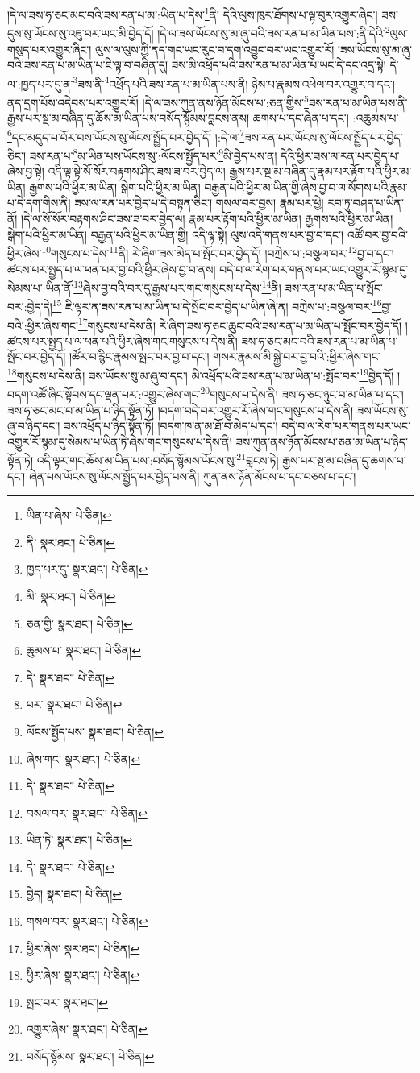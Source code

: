 །དེ་ལ་ཟས་ཧ་ཅང་མང་བའི་ཟས་རན་པ་མ་:ཡིན་པ་དེས་\footnote{ཡིན་པ་ཞེས་  པེ་ཅིན། }ནི། དེའི་ལུས་ཁུར་ཐོགས་པ་ལྟ་བུར་འགྱུར་ཞིང་། ཟས་དུས་སུ་ཡོངས་སུ་འཇུ་བར་ཡང་མི་བྱེད་དོ། །དེ་ལ་ཟས་ཡོངས་སུ་མ་ཞུ་བའི་ཟས་རན་པ་མ་ཡིན་པས་:ནི་དེའི་\footnote{ནི་  སྣར་ཐང་།  པེ་ཅིན། }ལུས་གསུད་པར་འགྱུར་ཞིང་། ལུས་ལ་ལུས་ཀྱི་ནད་གང་ཡང་རུང་བ་དག་འབྱུང་བར་ཡང་འགྱུར་རོ། །ཟས་ཡོངས་སུ་མ་ཞུ་བའི་ཟས་རན་པ་མ་ཡིན་པ་ཇི་ལྟ་བ་བཞིན་དུ། ཟས་མི་འཕྲོད་པའི་ཟས་རན་པ་མ་ཡིན་པ་ཡང་དེ་དང་འདྲ་སྟེ། དེ་ལ་:ཁྱད་པར་དུ་ན་\footnote{ཁྱད་པར་དུ་  སྣར་ཐང་།  པེ་ཅིན། }ཟས་ནི་\footnote{མི་  སྣར་ཐང་།  པེ་ཅིན། }འཕྲོད་པའི་ཟས་རན་པ་མ་ཡིན་པས་ནི། ཉེས་པ་རྣམས་འཕེལ་བར་འགྱུར་བ་དང་། ནད་དྲག་པོས་འདེབས་པར་འགྱུར་རོ། །དེ་ལ་ཟས་ཀུན་ནས་ཉོན་མོངས་པ་:ཅན་གྱིས་\footnote{ཅན་གྱི་  སྣར་ཐང་།  པེ་ཅིན། }ཟས་རན་པ་མ་ཡིན་པས་ནི་རྒྱས་པར་སྔ་མ་བཞིན་དུ་ཆོས་མ་ཡིན་པས་བསོད་སྙོམས་བླངས་ནས། ཆགས་པ་དང་ཞེན་པ་དང་། :འཆུམས་པ་\footnote{ཆུམས་པ་  སྣར་ཐང་།  པེ་ཅིན། }དང་མདུད་པ་བོར་བས་ཡོངས་སུ་ལོངས་སྤྱོད་པར་བྱེད་དོ། །:དེ་ལ་\footnote{དེ་  སྣར་ཐང་།  པེ་ཅིན། }ཟས་རན་པར་ཡོངས་སུ་ལོངས་སྤྱོད་པར་བྱེད་ཅིང་། ཟས་རན་པ་\footnote{པར་  སྣར་ཐང་།  པེ་ཅིན། }མ་ཡིན་པས་ཡོངས་སུ་:ལོངས་སྤྱོད་པར་\footnote{ལོངས་སྤྱོད་པས་  སྣར་ཐང་།  པེ་ཅིན། }མི་བྱེད་པས་ན། དེའི་ཕྱིར་ཟས་ལ་རན་པར་བྱེད་པ་ཞེས་བྱ་སྟེ། འདི་ལྟ་སྟེ་སོ་སོར་བརྟགས་ཤིང་ཟས་ཟ་བར་བྱེད་ལ། རྒྱས་པར་སྔ་མ་བཞིན་དུ་རྣམ་པར་རྟོག་པའི་ཕྱིར་མ་ཡིན། རྒྱགས་པའི་ཕྱིར་མ་ཡིན། སྒེག་པའི་ཕྱིར་མ་ཡིན། བརྒྱན་པའི་ཕྱིར་མ་ཡིན་གྱི་ཞེས་བྱ་བ་ལ་སོགས་པའི་རྣམ་པ་དེ་དག་གིས་ནི། ཟས་ལ་རན་པར་བྱེད་པ་དེ་བསྟན་ཅིང་། གསལ་བར་བྱས། རྣམ་པར་ཕྱེ། རབ་ཏུ་བཤད་པ་ཡིན་ནོ། །དེ་ལ་སོ་སོར་བརྟགས་ཤིང་ཟས་ཟ་བར་བྱེད་ལ། རྣམ་པར་རྟོག་པའི་ཕྱིར་མ་ཡིན། རྒྱགས་པའི་ཕྱིར་མ་ཡིན། སྒེག་པའི་ཕྱིར་མ་ཡིན། བརྒྱན་པའི་ཕྱིར་མ་ཡིན་གྱི། འདི་ལྟ་སྟེ། ལུས་འདི་གནས་པར་བྱ་བ་དང་། འཚོ་བར་བྱ་བའི་ཕྱིར་ཞེས་\footnote{ཞེས་གང་  སྣར་ཐང་།  པེ་ཅིན། }གསུངས་པ་དེས་\footnote{དེ་  སྣར་ཐང་།  པེ་ཅིན། }ནི། རེ་ཞིག་ཟས་མེད་པ་སྤོང་བར་བྱེད་དོ། །བཀྲེས་པ་:བསྩལ་བར་\footnote{བསལ་བར་  སྣར་ཐང་།  པེ་ཅིན། }བྱ་བ་དང་། ཚངས་པར་སྤྱད་པ་ལ་ཕན་པར་བྱ་བའི་ཕྱིར་ཞེས་བྱ་བ་ནས། བདེ་བ་ལ་རེག་པར་གནས་པར་ཡང་འགྱུར་རོ་སྙམ་དུ་སེམས་པ་:ཡིན་ནོ་\footnote{ཡིན་ཏེ་  སྣར་ཐང་།  པེ་ཅིན། }ཞེས་བྱ་བའི་བར་དུ་རྒྱས་པར་གང་གསུངས་པ་དེས་\footnote{དེ་  སྣར་ཐང་།  པེ་ཅིན། }ནི། ཟས་རན་པ་མ་ཡིན་པ་སྤོང་བར་:བྱེད་དེ།\footnote{བྱེད།  སྣར་ཐང་།  པེ་ཅིན། } ཇི་ལྟར་ན་ཟས་རན་པ་མ་ཡིན་པ་དེ་སྤོང་བར་བྱེད་པ་ཡིན་ཞེ་ན། བཀྲེས་པ་:བསྩལ་བར་\footnote{གསལ་བར་  སྣར་ཐང་།  པེ་ཅིན། }བྱ་བའི་:ཕྱིར་ཞེས་གང་\footnote{ཕྱིར་ཞེས་  སྣར་ཐང་།  པེ་ཅིན། }གསུངས་པ་དེས་ནི། རེ་ཞིག་ཟས་ཧ་ཅང་ཆུང་བའི་ཟས་རན་པ་མ་ཡིན་པ་སྤོང་བར་བྱེད་དོ། །ཚངས་པར་སྤྱད་པ་ལ་ཕན་པའི་ཕྱིར་ཞེས་གང་གསུངས་པ་དེས་ནི། ཟས་ཧ་ཅང་མང་བའི་ཟས་རན་པ་མ་ཡིན་པ་སྤོང་བར་བྱེད་དོ། །ཚོར་བ་རྙིང་རྣམས་སྤང་བར་བྱ་བ་དང་། གསར་རྣམས་མི་སྐྱེ་བར་བྱ་བའི་:ཕྱིར་ཞེས་གང་\footnote{ཕྱིར་ཞེས་  སྣར་ཐང་།  པེ་ཅིན། }གསུངས་པ་དེས་ནི། ཟས་ཡོངས་སུ་མ་ཞུ་བ་དང་། མི་འཕྲོད་པའི་ཟས་རན་པ་མ་ཡིན་པ་:སྤོང་བར་\footnote{སྤང་བར་  སྣར་ཐང་། }བྱེད་དོ། །བདག་འཚོ་ཞིང་སྟོབས་དང་ལྡན་པར་:འགྱུར་ཞེས་གང་\footnote{འགྱུར་ཞེས་  སྣར་ཐང་།  པེ་ཅིན། }གསུངས་པ་དེས་ནི། ཟས་ཧ་ཅང་ཉུང་བ་མ་ཡིན་པ་དང་། ཟས་ཧ་ཅང་མང་བ་མ་ཡིན་པ་ཉིད་སྟོན་ཏོ། །བདག་བདེ་བར་འགྱུར་རོ་ཞེས་གང་གསུངས་པ་དེས་ནི། ཟས་ཡོངས་སུ་ཞུ་བ་ཉིད་དང་། ཟས་འཕྲོད་པ་ཉིད་སྟོན་ཏོ། །བདག་ཁ་ན་མ་ཐོ་བ་མེད་པ་དང་། བདེ་བ་ལ་རེག་པར་གནས་པར་ཡང་འགྱུར་རོ་སྙམ་དུ་སེམས་པ་ཡིན་ཏེ་ཞེས་གང་གསུངས་པ་དེས་ནི། ཟས་ཀུན་ནས་ཉོན་མོངས་པ་ཅན་མ་ཡིན་པ་ཉིད་སྟོན་ཏེ། འདི་ལྟར་གང་ཆོས་མ་ཡིན་པས་:བསོད་སྙོམས་ཡོངས་སུ་\footnote{བསོད་སྙོམས་  སྣར་ཐང་།  པེ་ཅིན། }བླངས་ཏེ། རྒྱས་པར་སྔ་མ་བཞིན་དུ་ཆགས་པ་དང་། ཞེན་པས་ཡོངས་སུ་ལོངས་སྤྱོད་པར་བྱེད་པས་ནི། ཀུན་ནས་ཉོན་མོངས་པ་དང་བཅས་པ་དང་། 